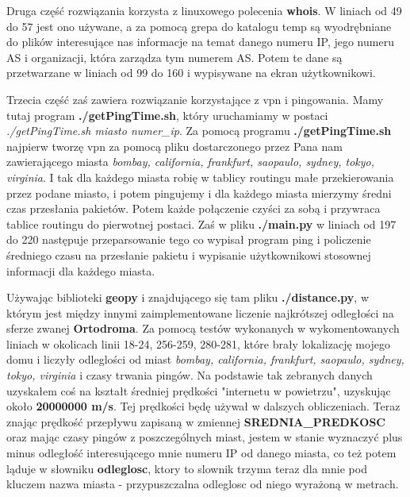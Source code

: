 \documentclass[11pt,a4paper]{article}
\begin{document}
Druga część rozwiązania korzysta z linuxowego polecenia \textbf{whois}. W liniach od 49 do 57 jest ono używane, a za pomocą grepa do katalogu temp są wyodrębniane do plików interesujące nas informacje na temat danego numeru IP, jego numeru AS i organizacji, która zarządza tym numerem AS. Potem te dane są przetwarzane w liniach od 99 do 160 i wypisywane na ekran użytkownikowi.

Trzecia część zaś zawiera rozwiązanie korzystające z vpn i pingowania. Mamy tutaj program \textbf{./getPingTime.sh}, który uruchamiamy w postaci \textit{./getPingTime.sh miasto numer\_ip}. Za pomocą programu \textbf{./getPingTime.sh} najpierw tworzę vpn za pomocą pliku dostarczonego przez Pana nam zawierającego miasta \textit{bombay, california, frankfurt, saopaulo, sydney, tokyo, virginia}. I tak dla każdego miasta robię w tablicy routingu małe przekierowania przez podane miasto, i potem pingujemy i dla każdego miasta mierzymy średni czas przesłania pakietów. Potem każde połączenie czyści za sobą i przywraca tablice routingu do pierwotnej postaci. Zaś w pliku \textbf{./main.py} w liniach od 197 do 220 następuje przeparsowanie tego co wypisał program ping i policzenie średniego czasu na przesłanie pakietu i wypisanie użytkownikowi stosownej informacji dla każdego miasta. 

Używając biblioteki \textbf{geopy} i znajdującego się tam pliku \textbf{./distance.py}, w którym jest między innymi zaimplementowane liczenie najkrótszej odległości na sferze zwanej \textbf{Ortodroma}. Za pomocą testów wykonanych w wykomentowanych liniach w okolicach linii 18-24, 256-259, 280-281, które brały lokalizację mojego domu i liczyły odleglości od miast \textit{bombay, california, frankfurt, saopaulo, sydney, tokyo, virginia} i czasy trwania pingów. Na podstawie tak zebranych danych uzyskałem coś na kształt
średniej prędkości "internetu w powietrzu", uzyskując około \textbf{20000000 m/s}. Tej prędkości będę używał w dalszych obliczeniach. Teraz znając prędkość przepływu zapisaną w zmiennej \textbf{SREDNIA_PREDKOSC} oraz mając czasy pingów z poszczególnych miast, jestem w stanie wyznaczyć plus minus odległość interesującego mnie numeru IP od danego miasta, co też potem ląduje w słowniku \textbf{odleglosc}, ktory to slownik trzyma teraz dla mnie pod kluczem nazwa miasta - przypuszczalna odleglosc od niego wyrażoną w metrach.
\end{document}
